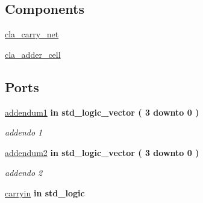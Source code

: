 \subsection*{Components}
 \begin{DoxyCompactItemize}
\item 
\hyperlink{group___nibble_adder_ga12bdc5892f526938e1447d663d152df8}{cla\+\_\+carry\+\_\+net}  {\bfseries }  
\item 
\hyperlink{group___nibble_adder_ga4f13eb52457f650b1d2cd352d9cacca9}{cla\+\_\+adder\+\_\+cell}  {\bfseries }  
\end{DoxyCompactItemize}
\subsection*{Ports}
 \begin{DoxyCompactItemize}
\item 
\hyperlink{group___nibble_adder_ga2c8945f4747b9a5448412c95fc281c87}{addendum1}  {\bfseries {\bfseries \textcolor{vhdlchar}{in}\textcolor{vhdlchar}{ }}} {\bfseries \textcolor{vhdlchar}{std\+\_\+logic\+\_\+vector}\textcolor{vhdlchar}{ }\textcolor{vhdlchar}{(}\textcolor{vhdlchar}{ }\textcolor{vhdlchar}{ } \textcolor{vhdldigit}{3} \textcolor{vhdlchar}{ }\textcolor{vhdlchar}{downto}\textcolor{vhdlchar}{ }\textcolor{vhdlchar}{ } \textcolor{vhdldigit}{0} \textcolor{vhdlchar}{ }\textcolor{vhdlchar}{)}\textcolor{vhdlchar}{ }} 
\begin{DoxyCompactList}\small\item\em addendo 1 \end{DoxyCompactList}\item 
\hyperlink{group___nibble_adder_gad1fa6d9d78208885ad2f4c417fc4b530}{addendum2}  {\bfseries {\bfseries \textcolor{vhdlchar}{in}\textcolor{vhdlchar}{ }}} {\bfseries \textcolor{vhdlchar}{std\+\_\+logic\+\_\+vector}\textcolor{vhdlchar}{ }\textcolor{vhdlchar}{(}\textcolor{vhdlchar}{ }\textcolor{vhdlchar}{ } \textcolor{vhdldigit}{3} \textcolor{vhdlchar}{ }\textcolor{vhdlchar}{downto}\textcolor{vhdlchar}{ }\textcolor{vhdlchar}{ } \textcolor{vhdldigit}{0} \textcolor{vhdlchar}{ }\textcolor{vhdlchar}{)}\textcolor{vhdlchar}{ }} 
\begin{DoxyCompactList}\small\item\em addendo 2 \end{DoxyCompactList}\item 
\hyperlink{group___nibble_adder_gaa556a73dc4a4de1a0d662b25adbcbe33}{carryin}  {\bfseries {\bfseries \textcolor{vhdlchar}{in}\textcolor{vhdlchar}{ }}} {\bfseries \textcolor{vhdlchar}{std\+\_\+logic}\textcolor{vhdlchar}{ }} 

\end{DoxyCompactItemize}
